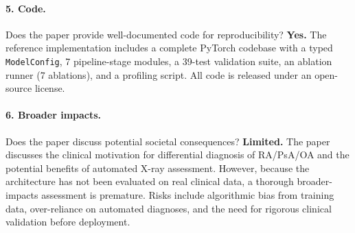 \documentclass{article}
\begin{document}
\paragraph{5. Code.}
Does the paper provide well-documented code for reproducibility?
\textbf{Yes.} The reference implementation includes a complete PyTorch codebase with a typed \texttt{ModelConfig}, 7 pipeline-stage modules, a 39-test validation suite, an ablation runner (7 ablations), and a profiling script. All code is released under an open-source license.

\paragraph{6. Broader impacts.}
Does the paper discuss potential societal consequences?
\textbf{Limited.} The paper discusses the clinical motivation for differential diagnosis of RA/PsA/OA and the potential benefits of automated X-ray assessment. However, because the architecture has not been evaluated on real clinical data, a thorough broader-impacts assessment is premature. Risks include algorithmic bias from training data, over-reliance on automated diagnoses, and the need for rigorous clinical validation before deployment.
\end{document}
